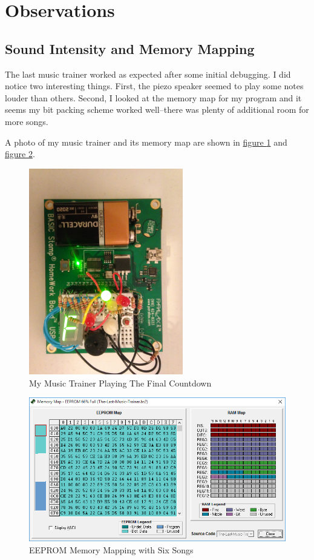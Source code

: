 \documentclass[11pt]{article}
\begin{document}
\section{Observations}

\subsection{Sound Intensity and Memory Mapping}

The last music trainer worked as expected after some initial debugging.
I did notice two interesting things. 
First, the piezo speaker seemed to play some notes louder than others.
Second, I looked at the memory map for my program and it seems my bit
packing scheme worked well--there was plenty of additional room for
more songs.

A photo of my music trainer and its memory map are shown in
\hyperref[the-music-trainer]{figure \ref{the-music-trainer}} and
\hyperref[memory-map]{figure \ref{memory-map}}.

\begin{figure}
\centering
\includegraphics[width=0.6\textwidth]{the-music-trainer.jpg}
\caption{My Music Trainer Playing The Final Countdown}
\label{the-music-trainer}
\end{figure}

\begin{figure}
\centering
\includegraphics[width=\textwidth]{memory-map.png}
\caption{EEPROM Memory Mapping with Six Songs}
\label{memory-map}
\end{figure}
\end{document}

